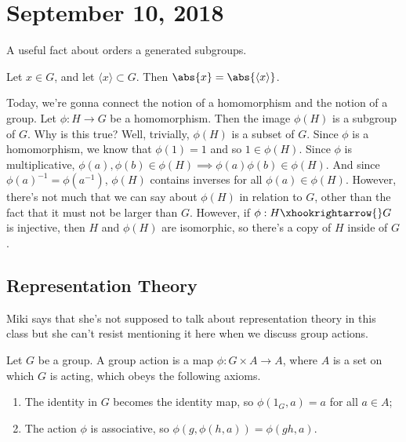 \section{September 10, 2018}

A useful fact about orders a generated subgroups.

\begin{lemma}
Let $x \in G$, and let $\langle x \rangle \subset G$. Then $\abs{x} = \abs{\langle x \rangle}$.
\end{lemma}

Today, we're gonna connect the notion of a homomorphism and the notion of a group. Let $\phi : H \to G$ be a homomorphism. Then the image $\phi(H)$ is a subgroup of $G$. Why is this true? Well, trivially, $\phi(H)$ is a subset of $G$. Since $\phi$ is a homomorphism, we know that $\phi(1) = 1$ and so $1 \in \phi(H)$. Since $\phi$ is multiplicative, $\phi(a),\phi(b) \in \phi(H) \implies \phi(a)\phi(b) \in \phi(H)$. And since $\phi(a)^{-1} = \phi(a^{-1})$, $\phi(H)$ contains inverses for all $\phi(a) \in \phi(H)$. However, there's not much that we can say about $\phi(H)$ in relation to $G$, other than the fact that it must not be larger than $G$. However, if $\phi : H \xhookrightarrow{} G$ is injective, then $H$ and $\phi(H)$ are isomorphic, so there's a copy of $H$ inside of $G$.

\subsection{Representation Theory}

Miki says that she's not supposed to talk about representation theory in this class but she can't resist mentioning it here when we discuss group actions.

\begin{definition}
Let $G$ be a group. A group action is a map $\phi : G \times A \to A$, where $A$ is a set on which $G$ is acting, which obeys the following axioms.
\begin{enumerate}
\item The identity in $G$ becomes the identity map, so $\phi(1_G, a) = a$ for all $a \in A$;
\item The action $\phi$ is associative, so $\phi(g, \phi(h,a)) = \phi(gh, a)$.
\end{enumerate} 
\end{definition}

